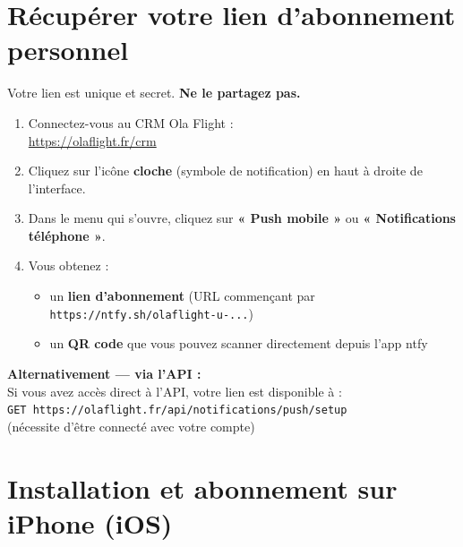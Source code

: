 \documentclass[a4paper, 11pt]{article}
\begin{document}
\section{Récupérer votre lien d'abonnement personnel}

Votre lien est unique et secret. \textbf{Ne le partagez pas.}

\begin{enumerate}[leftmargin=*, label=\textbf{\arabic*.}]

  \item Connectez-vous au CRM Ola Flight :\\
  \href{https://olaflight.fr/crm}{https://olaflight.fr/crm}

  \item Cliquez sur l'icône \textbf{cloche} (symbole de notification) en haut à droite de l'interface.

  \item Dans le menu qui s'ouvre, cliquez sur \textbf{« Push mobile »} ou
  \textbf{« Notifications téléphone »}.

  \item Vous obtenez :
  \begin{itemize}[leftmargin=2em]
    \item un \textbf{lien d'abonnement} (URL commençant par \texttt{https://ntfy.sh/olaflight-u-...})
    \item un \textbf{QR code} que vous pouvez scanner directement depuis l'app ntfy
  \end{itemize}

\end{enumerate}

\begin{infobox}
\textbf{Alternativement — via l'API :}\\
Si vous avez accès direct à l'API, votre lien est disponible à :\\
\texttt{GET https://olaflight.fr/api/notifications/push/setup}\\
(nécessite d'être connecté avec votre compte)
\end{infobox}

\section{Installation et abonnement sur iPhone (iOS)}
\end{document}
